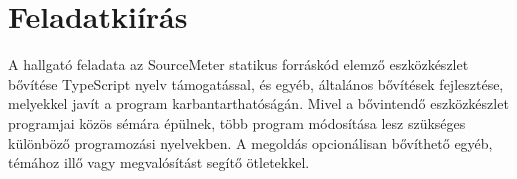 \chapter*{Feladatkiírás}

\noindent
A hallgató feladata az SourceMeter statikus forráskód elemző eszközkészlet bővítése TypeScript nyelv támogatással, és egyéb, általános bővítések fejlesztése, melyekkel javít a program karbantarthatóságán. Mivel a bővintendő eszközkészlet programjai közös sémára épülnek, több program módosítása lesz szükséges különböző programozási nyelvekben. A megoldás opcionálisan bővíthető egyéb, témához illő vagy megvalósítást segítő ötletekkel.
